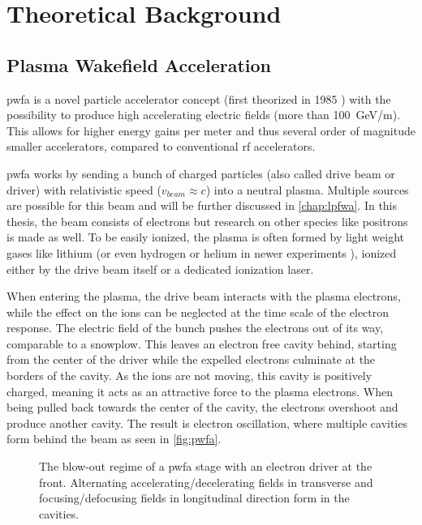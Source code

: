 \documentclass[bachelor_thesis]{subfiles}
\begin{document}
\chapter{Theoretical Background} \label{chap:theory}
\section{Plasma Wakefield Acceleration}
\Gls{pwfa} is a novel particle accelerator concept (first theorized in 1985 \cite{Chen1985}) with the possibility to produce high accelerating electric fields (more than \qty{100}{\GeV/\m}). This allows for higher energy gains per meter
and thus several order of magnitude smaller accelerators, compared to conventional \gls{rf} accelerators.

\Gls{pwfa} works by sending a bunch of charged particles (also called drive beam or driver) with relativistic speed ($v_{beam}\approx c$) into a neutral plasma. Multiple sources are possible for this beam and will be further discussed in \autoref{chap:lpfwa}.
In this thesis, the beam consists of electrons but research on other species like positrons \cite{Gessner2016} is made as well. To be easily ionized, the plasma is often formed by light weight gases like lithium (or even hydrogen or helium in newer experiments \cite{Schoebel2022}), 
ionized either by the drive beam itself or a dedicated ionization laser.

When entering the plasma, the drive beam interacts with the plasma electrons, while the effect on the ions can be neglected at the time scale of the electron response. The electric field of the bunch pushes the electrons out of its way, comparable to a snowplow. 
This leaves an electron free cavity behind, starting from the center of the driver while the expelled electrons culminate at the borders of the cavity. As the ions are not moving, this cavity is positively charged, meaning it acts as an attractive force to the plasma electrons.
When being pulled back towards the center of the cavity, the electrons overshoot and produce another cavity. The result is electron oscillation, where multiple cavities form behind the beam as seen in \autoref{fig:pwfa}.

\begin{figure}
	\centering
	\caption{The blow-out regime of a \gls{pwfa} stage with an electron driver at the front. Alternating accelerating/decelerating fields in transverse and focusing/defocusing fields in longitudinal direction form in the cavities.}
	\label{fig:pwfa}
\end{figure}
\end{document}
